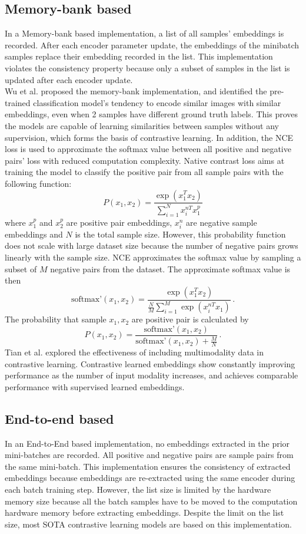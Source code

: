 \documentclass[12pt,twoside]{report}
\begin{document}
\subsection{Memory-bank based}
In a Memory-bank based implementation, a list of all samples' embeddings is recorded. After each encoder parameter update, the embeddings of the minibatch samples replace their embedding recorded in the list. This implementation violates the consistency property because only a subset of samples in the list is updated after each encoder update.\\

Wu et al.\cite{instdisc} proposed the memory-bank implementation, and identified the pre-trained classification model's tendency to encode similar images with similar embeddings, even when 2 samples have different ground truth labels. This proves the models are capable of learning similarities between samples without any supervision, which forms the basis of contrastive learning. In addition, the NCE loss is used to approximate the softmax value between all positive and negative pairs' loss with reduced computation complexity. Native contrast loss aims at training the model to classify the positive pair from all sample pairs with the following function: $$ P(x_1, x_2) = \frac{\exp(x_1^T x_2)}{\sum_{i = 1}^{N} x^{nT}_i x^p_1} $$ where $x^p_1$ and $x^p_2$ are positive pair embeddings, $x^n_i$ are negative sample embeddings and $N$ is the total sample size. However, this probability function does not scale with large dataset size because the number of negative pairs grows linearly with the sample size. NCE approximates the softmax value by sampling a subset of $M$ negative pairs from the dataset. The approximate softmax value is then $$ \text{softmax'}(x_1, x_2) = \frac{\exp(x_1^T x_2)}{\frac{N}{M}\sum_{i = 1}^{M} \exp(x^{nT}_i x_1)} \,.$$The probability that sample $x_1, x_2$ are positive pair is calculated by $$ P(x_1, x_2) = \frac{\text{softmax'}(x_1, x_2)}{\text{softmax'}(x_1, x_2) + \frac{M}{N}}\,.$$Tian et al.\cite{cmc} explored the effectiveness of including multimodality data in contrastive learning. Contrastive learned embeddings show constantly improving performance as the number of input modality increases, and achieves comparable performance with supervised learned embeddings. 

\subsection{End-to-end based}
In an End-to-End based implementation, no embeddings extracted in the prior mini-batches are recorded. All positive and negative pairs are sample pairs from the same mini-batch. This implementation ensures the consistency of extracted embeddings because embeddings are re-extracted using the same encoder during each batch training step. However, the list size is limited by the hardware memory size because all the batch samples have to be moved to the computation hardware memory before extracting embeddings. Despite the limit on the list size, most SOTA contrastive learning models are based on this implementation. \\
\end{document}
